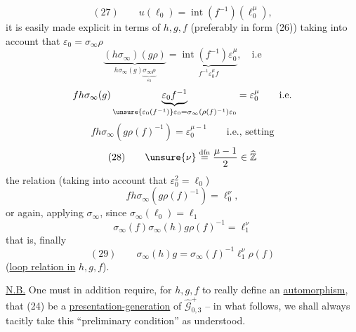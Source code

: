 \[
(27)\qquad
u(\ell_0)=\operatorname{int}(f^{-1})(\ell_0^{\mu}),
\]
it is easily made explicit in terms of $h,g,f$ (preferably in form (26)) taking into account that $\varepsilon_0=\sigma_\infty\rho$
\[
\underbrace{(h\sigma_\infty)(g\rho)}_{h\sigma_\infty(g)\underbrace{\sigma_\infty\rho}_{\varepsilon_0}}
=\underbrace{\operatorname{int}(f^{-1})\varepsilon_0^{\mu}}_{f^{-1}\varepsilon_0^{\mu}f},\quad\text{i.e}
\]
\[
f h\sigma_\infty(g)\underbrace{\varepsilon_0 f^{-1}}_{\unsure{\varepsilon_0(f^{-1})}\varepsilon_0=\sigma_\infty(\rho(f)^{-1})\varepsilon_0}
=\varepsilon_0^{\mu}\qquad\text{i.e.}
\]
\[
f h\sigma_\infty(g\rho(f)^{-1})=\varepsilon_0^{\mu-1}
\qquad\text{i.e., setting}
\]
\[
(28)\qquad \unsure{\nu}\overset{\mathrm{dfn}}{=}\frac{\mu-1}{2}\in\widehat{\mathbb Z}
\]
the relation (taking into account that $\varepsilon_0^{2}=\ell_0$)
\[
f h\sigma_\infty(g\rho(f)^{-1})=\ell_0^{\nu},
\]
or again, applying $\sigma_\infty$, since $\sigma_\infty(\ell_0)=\ell_1$
\[
\sigma_\infty(f)\sigma_\infty(h)g\rho(f)^{-1}=\ell_1^{\nu}
\]
that is, finally
\[
(29)\qquad
\boxed{\sigma_\infty(h)g=\sigma_\infty(f)^{-1}\ell_1^{\nu}\rho(f)}
\]
(\uline{loop relation in} $h,g,f$).


\uline{N.B.} One must in addition require, for $h,g,f$ to really define an \uline{automorphism}, that (24) be a \uline{presentation-generation} of $\widehat{\mathcal G}_{0,3}^{+}$ -- in what follows, we shall always tacitly take this ``preliminary condition'' as understood.